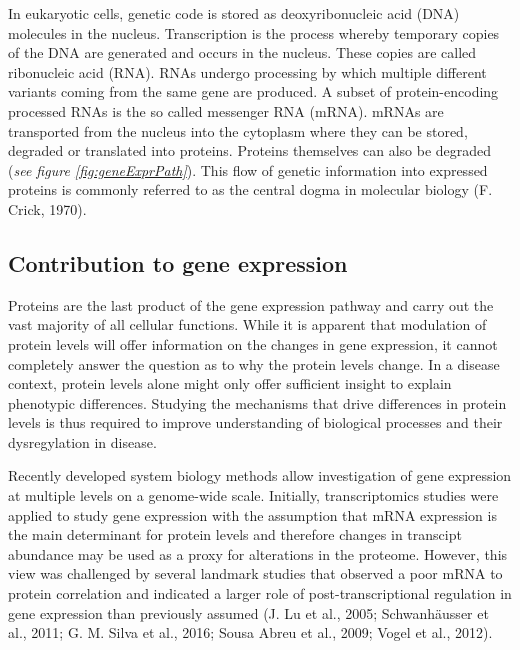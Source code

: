 \documentclass[12pt,openany]{book}
\begin{document}
In eukaryotic cells, genetic code is stored as deoxyribonucleic acid
(DNA) molecules in the nucleus. Transcription is the process whereby
temporary copies of the DNA are generated and occurs in the nucleus.
These copies are called ribonucleic acid (RNA). RNAs undergo processing
by which multiple different variants coming from the same gene are
produced. A subset of protein-encoding processed RNAs is the so called
messenger RNA (mRNA). mRNAs are transported from the nucleus into the
cytoplasm where they can be stored, degraded or translated into
proteins. Proteins themselves can also be degraded (\emph{see figure
\ref{fig:geneExprPath}}). This flow of genetic information into
expressed proteins is commonly referred to as the central dogma in
molecular biology (F. Crick, 1970). \clearpage
\subsection{Contribution to gene expression} Proteins are the last
product of the gene expression pathway and carry out the vast majority
of all cellular functions. While it is apparent that modulation of
protein levels will offer information on the changes in gene expression,
it cannot completely answer the question as to why the protein levels
change. In a disease context, protein levels alone might only offer
sufficient insight to explain phenotypic differences. Studying the
mechanisms that drive differences in protein levels is thus required to
improve understanding of biological processes and their dysregylation in
disease.

Recently developed system biology methods allow investigation of gene
expression at multiple levels on a genome-wide scale. Initially,
transcriptomics studies were applied to study gene expression with the
assumption that mRNA expression is the main determinant for protein
levels and therefore changes in transcipt abundance may be used as a
proxy for alterations in the proteome. However, this view was challenged
by several landmark studies that observed a poor mRNA to protein
correlation and indicated a larger role of post-transcriptional
regulation in gene expression than previously assumed (J. Lu et al.,
2005; Schwanhäusser et al., 2011; G. M. Silva et al., 2016; Sousa Abreu
et al., 2009; Vogel et al., 2012).
\end{document}
